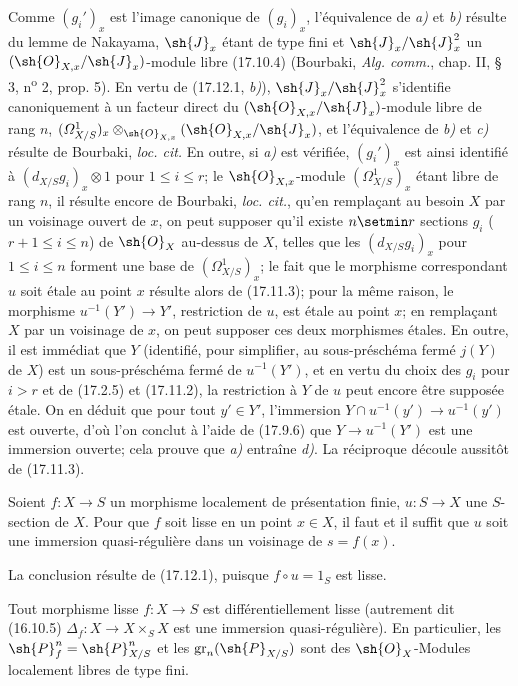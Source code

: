 Comme $(g_i')_x$ est l'image canonique de $(g_i)_x$, l'équivalence de \emph{a)} et \emph{b)} résulte du lemme de Nakayama, $\sh{J}_x$ étant de type fini et $\sh{J}_x/\sh{J}_x^2$ un $(\sh{O}_{X,x}/\sh{J}_x)$-module libre (17.10.4) (Bourbaki, \emph{Alg. comm.}, chap. II, § 3, n\textsuperscript{o} 2, prop. 5). En vertu de (17.12.1, \emph{b)}), $\sh{J}_x/\sh{J}_x^2$ s'identifie canoniquement à un facteur direct du $(\sh{O}_{X,x}/\sh{J}_x)$-module libre de rang $n$, $(\varOmega^1_{X/S})_x\otimes_{\sh{O}_{X,x}}(\sh{O}_{X,x}/\sh{J}_x)$, et l'équivalence de \emph{b)} et \emph{c)} résulte de Bourbaki, \emph{loc. cit.} En outre, si \emph{a)} est vérifiée, $(g_i')_x$ est ainsi identifié à $(d_{X/S}g_i)_x\otimes1$ pour $1\leq i\leq r$; le $\sh{O}_{X,x}$-module $(\varOmega^1_{X/S})_x$ étant libre de rang $n$, il résulte encore de Bourbaki, \emph{loc. cit.}, qu'en remplaçant au besoin $X$ par un voisinage ouvert de $x$, on peut supposer qu'il existe $n\setmin r$ sections $g_i$ ($r+1\leq i\leq n$) de $\sh{O}_X$ au-dessus de $X$, telles que les $(d_{X/S}g_i)_x$ pour $1\leq i\leq n$ forment une base de $(\varOmega^1_{X/S})_x$; le fait que le morphisme correspondant $u$ soit étale au point $x$ résulte alors de (17.11.3); pour la même raison, le morphisme $u^{-1}(Y')\to Y'$, restriction de $u$, est étale au point $x$; en remplaçant $X$ par un voisinage de $x$, on peut supposer ces deux morphismes étales. En outre, il est immédiat que $Y$ (identifié, pour simplifier, au sous-préschéma fermé $j(Y)$ de $X$) est un sous-préschéma fermé de $u^{-1}(Y')$, et en vertu du choix des $g_i$ pour $i>r$ et de (17.2.5) et (17.11.2), la restriction à $Y$ de $u$ peut encore être supposée étale. On en déduit que pour tout $y'\in Y'$, l'immersion $Y\cap u^{-1}(y')\to u^{-1}(y')$ est ouverte, d'où l'on conclut à l'aide de (17.9.6) que $Y\to u^{-1}(Y')$ est une immersion ouverte; cela prouve que \emph{a)} entraîne \emph{d)}. La réciproque découle aussitôt de (17.11.3).

\begin{corollary}[17.12.3]
\label{IV.17.12.3}
Soient $f:X\to S$ un morphisme localement de présentation finie, $u:S\to X$ une $S$-section de $X$. Pour que $f$ soit lisse en un point $x\in X$, il faut et il suffit que $u$ soit une immersion quasi-régulière dans un voisinage de $s=f(x)$.
\end{corollary}

La conclusion résulte de (17.12.1), puisque $f\circ u=1_S$ est lisse.

\begin{proposition}[17.12.4]
\label{IV.17.12.4}
Tout morphisme lisse $f:X\to S$ est différentiellement lisse \textup{(autrement dit (16.10.5) $\Delta_f:X\to X\times_SX$ est une immersion quasi-régulière)}. En particulier, les $\sh{P}_f^n=\sh{P}_{X/S}^n$ et les $\operatorname{gr}_n(\sh{P}_{X/S})$ sont des $\sh{O}_X$-Modules localement libres de type fini.
\end{proposition}

